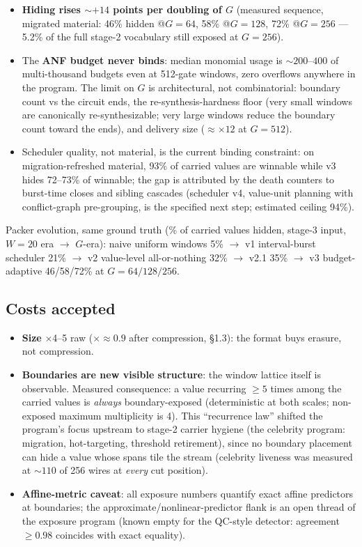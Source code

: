 \documentclass[11pt]{article}
\begin{document}
\begin{itemize}
\item \textbf{Hiding rises ${\sim}{+}14$ points per doubling of $G$}
  (measured sequence, migrated material: 46\% hidden @$G{=}64$, 58\%
  @$G{=}128$, 72\% @$G{=}256$ --- 5.2\% of the full stage-2 vocabulary still
  exposed at $G{=}256$).
\item The \textbf{ANF budget never binds}: median monomial usage is
  ${\sim}200$--$400$ of multi-thousand budgets even at 512-gate windows,
  zero overflows anywhere in the program. The limit on $G$ is architectural,
  not combinatorial: boundary count vs the circuit ends, the
  re-synthesis-hardness floor (very small windows are canonically
  re-synthesizable; very large windows reduce the boundary count toward the
  ends), and delivery size ($\approx\times 12$ at $G{=}512$).
\item Scheduler quality, not material, is the current binding constraint: on
  migration-refreshed material, 93\% of carried values are winnable while v3
  hides 72--73\% of winnable; the gap is attributed by the death counters to
  burst-time closes and sibling cascades (scheduler v4, value-unit planning
  with conflict-graph pre-grouping, is the specified next step; estimated
  ceiling 94\%).
\end{itemize}

Packer evolution, same ground truth (\% of carried values hidden, stage-3
input, $W{=}20$ era $\to$ $G$-era): naive uniform windows 5\% $\to$ v1
interval-burst scheduler 21\% $\to$ v2 value-level all-or-nothing 32\% $\to$
v2.1 35\% $\to$ v3 budget-adaptive 46/58/72\% at $G=64/128/256$.

\subsection{Costs accepted}

\begin{itemize}
\item \textbf{Size} $\times$4--5 raw ($\times{\approx}0.9$ after
  compression, \S1.3): the format buys erasure, not compression.
\item \textbf{Boundaries are new visible structure}: the window lattice
  itself is observable. Measured consequence: a value recurring $\geq 5$
  times among the carried values is \emph{always} boundary-exposed
  (deterministic at both scales; non-exposed maximum multiplicity is 4).
  This ``recurrence law'' shifted the program's focus upstream to stage-2
  carrier hygiene (the celebrity program: migration, hot-targeting,
  threshold retirement), since no boundary placement can hide a value whose
  spans tile the stream (celebrity liveness was measured at ${\sim}110$ of
  256 wires at \emph{every} cut position).
\item \textbf{Affine-metric caveat}: all exposure numbers quantify exact
  affine predictors at boundaries; the approximate/nonlinear-predictor flank
  is an open thread of the exposure program (known empty for the QC-style
  detector: agreement $\geq 0.98$ coincides with exact equality).
\end{itemize}
\end{document}
